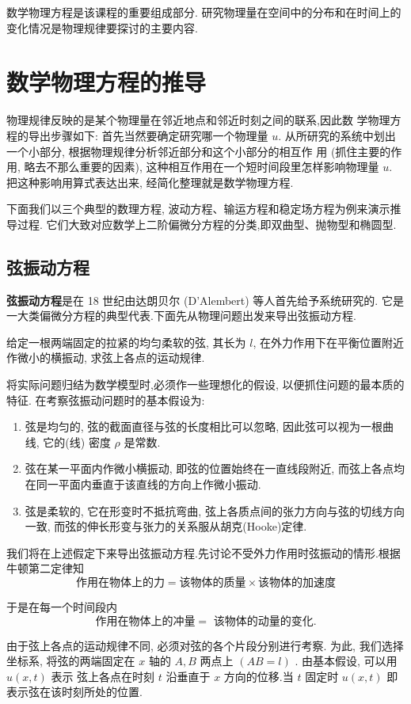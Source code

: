 数学物理方程是该课程的重要组成部分.
研究物理量在空间中的分布和在时间上的变化情况是物理规律要探讨的主要内容.
\section{数学物理方程的推导}
物理规律反映的是某个物理量在邻近地点和邻近时刻之间的联系,因此数
学物理方程的导出步骤如下: 首先当然要确定研究哪一个物理量 $u$. 从所研究的系统中划出一个小部分, 
根据物理规律分析邻近部分和这个小部分的相互作
用 (抓住主要的作用, 略去不那么重要的因素), 这种相互作用在一个短时间段里怎样影响物理量 $u$.
 把这种影响用算式表达出来, 经简化整理就是数学物理方程.

下面我们以三个典型的数理方程, 波动方程、输运方程和稳定场方程为例来演示推导过程.
它们大致对应数学上二阶偏微分方程的分类,即双曲型、抛物型和椭圆型.

\subsection{弦振动方程}
\textbf{弦振动方程}是在 18 世纪由达朗贝尔 (D'Alembert) 等人首先给予系统研究的.
它是一大类偏微分方程的典型代表.下面先从物理问题出发来导出弦振动方程.

给定一根两端固定的拉紧的均匀柔软的弦, 其长为 $l$, 在外力作用下在平衡位置附近作微小的横振动, 
求弦上各点的运动规律.

将实际问题归结为数学模型时,必须作一些理想化的假设, 以便抓住问题的最本质的特征.
在考察弦振动问题时的基本假设为:
\begin{enumerate}
    \item  弦是均匀的, 弦的截面直径与弦的长度相比可以忽略, 因此弦可以视为一根曲线, 
        它的(线) 密度 $\rho$ 是常数.
    \item 弦在某一平面内作微小横振动, 即弦的位置始终在一直线段附近, 
        而弦上各点均在同一平面内垂直于该直线的方向上作微小振动.
    \item  弦是柔软的, 它在形变时不抵抗弯曲, 弦上各质点间的张力方向与弦的切线方向一致,
        而弦的伸长形变与张力的关系服从胡克(Hooke)定律.
\end{enumerate}

我们将在上述假定下来导出弦振动方程.先讨论不受外力作用时弦振动的情形.根据牛顿第二定律知
$$
\text{作用在物体上的力} = \text{该物体的质量} \times \text{该物体的加速度}
$$

于是在每一个时间段内
$$
\text{作用在物体上的冲量} = \text{ 该物体的动量的变化}.
$$

由于弦上各点的运动规律不同, 必须对弦的各个片段分别进行考察.
为此, 我们选择坐标系, 将弦的两端固定在 $x$ 轴的 $A,B$ 两点上 $(AB=l)$ .
由基本假设, 可以用 $u(x, t)$ 表示
弦上各点在时刻 $t$ 沿垂直于 $x$ 方向的位移.当 $t$ 固定时 $u(x, t)$ 即表示弦在该时刻所处的位置.


